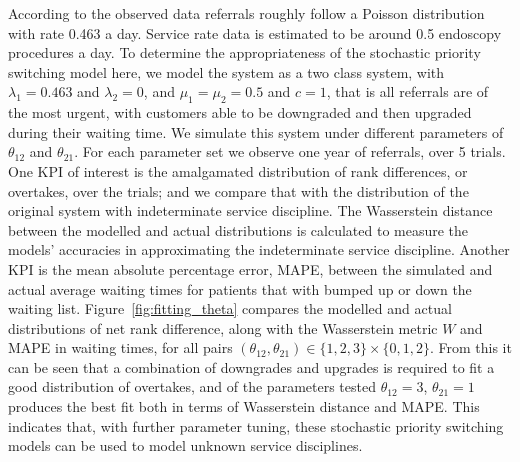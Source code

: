 \documentclass{article}
\begin{document}
According to the observed data referrals roughly follow a Poisson distribution
with rate 0.463 a day. Service rate data is estimated to be around 0.5
endoscopy procedures a day. To determine the appropriateness of the stochastic
priority switching model here, we model the system as a two class system, with
$\lambda_1 = 0.463$ and $\lambda_2 = 0$, and $\mu_1 = \mu_2 = 0.5$ and $c = 1$,
that is all referrals are of the most urgent, with customers able to be
downgraded and then upgraded during their waiting time. We simulate this
system under different parameters of $\theta_{12}$ and $\theta_{21}$. For each
parameter set we observe one year of referrals, over 5 trials. One KPI of
interest is the amalgamated distribution of rank differences, or overtakes,
over the trials; and we compare that with the
distribution of the original system with indeterminate service discipline. The
Wasserstein distance \cite{mostafaei11} between the modelled and actual
distributions is calculated to measure the models' accuracies in approximating
the indeterminate service discipline.
Another KPI is the mean absolute percentage error, MAPE, between the simulated
and actual average waiting times for patients that with bumped up or down the
waiting list.
Figure~\ref{fig:fitting_theta} compares the modelled and actual distributions of
net rank difference, along with the Wasserstein metric $W$ and MAPE in waiting
times, for all pairs
$\left(\theta_{12}, \theta_{21}\right) \in \{1, 2, 3\}\times\{0, 1, 2\}$. From
this it can be seen that a combination of downgrades and upgrades is required to
fit a good distribution of overtakes, and of the parameters tested
$\theta_{12}=3$, $\theta_{21}=1$ produces the best fit both in terms of
Wasserstein distance and MAPE. This indicates that, with further parameter
tuning, these stochastic priority switching models can be used to model unknown
service disciplines.
\end{document}
